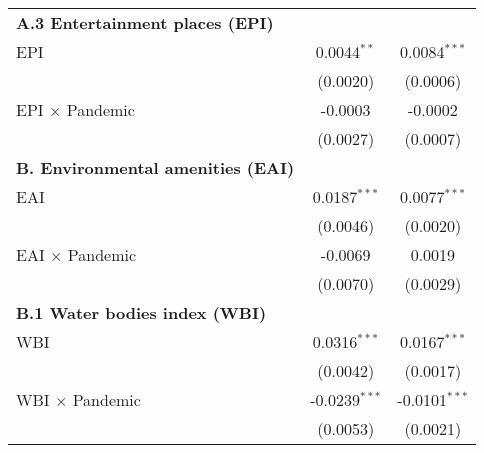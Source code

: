 {\begin{tabular}{lcc}
      \textbf{A.3 Entertainment places (EPI)}\\
      \hspace{0.5cm} EPI                                       & 0.0044$^{**}$          & 0.0084$^{***}$            \\
      \hspace{0.5cm}                                           & (0.0020)        		& (0.0006)                  \\
      \hspace{0.5cm} EPI $\times$ Pandemic                     & -0.0003         		& -0.0002                   \\
      \hspace{0.5cm}                                           & (0.0027)        		& (0.0007)                  \\

      \textbf{B. Environmental amenities (EAI)}\\
      \hspace{0.5cm} EAI                                       & 0.0187$^{***}$   		& 0.0077$^{***}$           \\
      \hspace{0.5cm}                                           & (0.0046)        		& (0.0020)                 \\
      \hspace{0.5cm} EAI $\times$ Pandemic                     & -0.0069  				& 0.0019          \\
      \hspace{0.5cm}                                           & (0.0070)        		& (0.0029)                 \\

      \textbf{B.1 Water bodies index (WBI)}\\
      \hspace{0.5cm} WBI                                       & 0.0316$^{***}$         & 0.0167$^{***}$           \\
      \hspace{0.5cm}                                           & (0.0042)        		& (0.0017)                 \\
      \hspace{0.5cm} WBI $\times$ Pandemic                     & -0.0239$^{***}$  		& -0.0101$^{***}$          \\
      \hspace{0.5cm}                                           & (0.0053)        		& (0.0021)                 \\


\end{tabular}}
